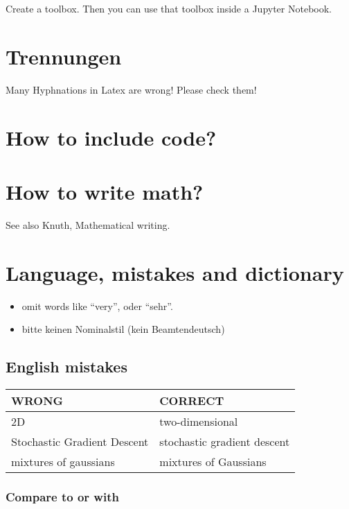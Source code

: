 \documentclass{mlthesis}
\begin{document}
Create a toolbox.  Then you can use that toolbox inside a Jupyter
Notebook.

\chapter{Trennungen}

Many Hyphnations in Latex are wrong!  Please check them!

\chapter{How to include code?}

\chapter{How to write math?}

See also Knuth, Mathematical writing.

\chapter{Language, mistakes and dictionary}

\begin{itemize}
\item omit words like ``very'', oder ``sehr''.
\item bitte keinen Nominalstil (kein Beamtendeutsch)
\end{itemize}

\section{English mistakes}
\begin{center}
  \begin{tabular}{|l|l|}
    WRONG                       & CORRECT                     \\ \hline
    2D                          &  two-dimensional            \\
    Stochastic Gradient Descent & stochastic gradient descent \\
    mixtures of gaussians       & mixtures of Gaussians 
  \end{tabular}
\end{center}

\subsection{Compare to or with}
\end{document}
